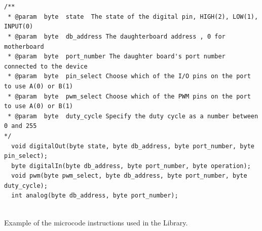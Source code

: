 	\begin{listing}[H]
		\footnotesize
		\begin{verbatim}
	

/**
 * @param  byte  state  The state of the digital pin, HIGH(2), LOW(1), INPUT(0)
 * @param  byte  db_address The daughterboard address , 0 for motherboard 
 * @param  byte  port_number The daughter board's port number connected to the device
 * @param  byte  pin_select Choose which of the I/O pins on the port to use A(0) or B(1)
 * @param  byte  pwm_select Choose which of the PWM pins on the port to use A(0) or B(1)
 * @param  byte  duty_cycle Specify the duty cycle as a number between 0 and 255
*/
  void digitalOut(byte state, byte db_address, byte port_number, byte pin_select);
  byte digitalIn(byte db_address, byte port_number, byte operation);
  void pwm(byte pwm_select, byte db_address, byte port_number, byte duty_cycle);
  int analog(byte db_address, byte port_number);
	
		\end{verbatim}
		\caption{Example of the \xten microcode instructions used in the Library.} \label{code:micro}
	\end{listing}

